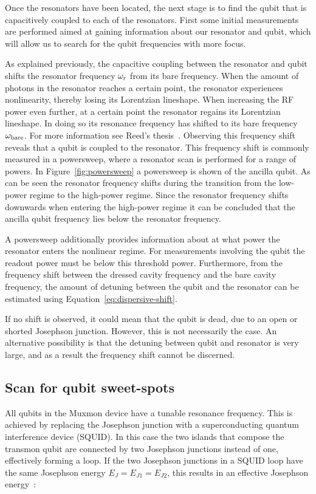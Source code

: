         Once the resonators have been located, the next stage is to find the qubit that is capacitively coupled to each of the resonators. First some initial measurements are performed aimed at gaining information about our resonator and qubit, which will allow us to search for the qubit frequencies with more focus.

        As explained previously, the capacitive coupling between the resonator and qubit shifts the resonator frequency $\omega_\text{r}$ from its bare frequency. When the amount of photons in the resonator reaches a certain point, the resonator experiences nonlinearity, thereby losing its Lorentzian lineshape. When increasing the RF power even further, at a certain point the resonator regains its Lorentzian lineshape. In doing so its resonance frequency has shifted to its bare frequency $\omega_\text{bare}$. For more information see Reed's thesis~\cite{Reed}. Observing this frequency shift reveals that a qubit is coupled to the resonator. This frequency shift is commonly measured in a powersweep, where a resonator scan is performed for a range of powers. In Figure~\ref{fig:powersweep} a powersweep is shown of the ancilla qubit. As can be seen the resonator frequency shifts during the transition from the low-power regime to the high-power regime. Since the resonator frequency shifts downwards when entering the high-power regime it can be concluded that the ancilla qubit frequency lies below the resonator frequency.

        A powersweep additionally provides information about at what power the resonator enters the nonlinear regime. For measurements involving the qubit the readout power must be below this threshold power. Furthermore, from the frequency shift between the dressed cavity frequency and the bare cavity frequency, the amount of detuning between the qubit and the resonator can be estimated using Equation~\ref{eq:dispersive-shift}.

        If no shift is observed, it could mean that the qubit is dead, due to an open or shorted Josephson junction. However, this is not necessarily the case. An alternative possibility is that the detuning between qubit and resonator is very large, and as a result the frequency shift cannot be discerned.

      \subsection{Scan for qubit sweet-spots}
        \label{Scan for qubit sweet-spots}
        All qubits in the Muxmon device have a tunable resonance frequency. This is achieved by replacing the Josephson junction with a superconducting quantum interference device (SQUID). In this case the two islands that compose the transmon qubit are connected by two Josephson junctions instead of one, effectively forming a loop. If the two Josephson junctions in a SQUID loop have the same Josephson energy $E_J=E_{J1}=E_{J2}$, this results in an effective Josephson energy~\cite[pp.54-56]{Reed}:


